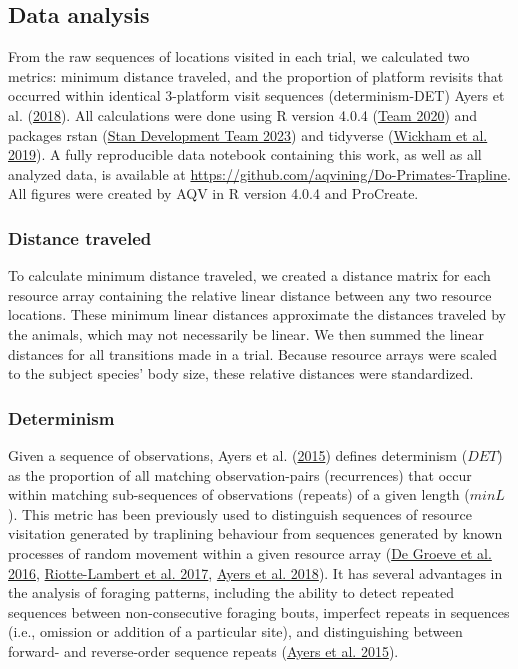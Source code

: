 \documentclass[twoside,12pt,final]{ucthesis-CA2012}
\begin{document}
\begin{ucmainmatter}
\hypertarget{data-analysis}{%
\subsection{Data analysis}\label{data-analysis}}

From the raw sequences of locations visited in each trial, we calculated two metrics: minimum distance traveled, and the proportion of platform revisits that occurred within identical 3-platform visit sequences (determinism-DET) Ayers et al. (\protect\hyperlink{ref-ayers2018}{2018}). All calculations were done using R version 4.0.4 (\protect\hyperlink{ref-team2020}{Team 2020}) and packages rstan (\protect\hyperlink{ref-standevelopmentteam2023}{Stan Development Team 2023}) and tidyverse (\protect\hyperlink{ref-wickham2019}{Wickham et al. 2019}). A fully reproducible data notebook containing this work, as well as all analyzed data, is available at \url{https://github.com/aqvining/Do-Primates-Trapline}. All figures were created by AQV in R version 4.0.4 and ProCreate.

\hypertarget{distance-traveled}{%
\subsubsection{Distance traveled}\label{distance-traveled}}

To calculate minimum distance traveled, we created a distance matrix for each resource array containing the relative linear distance between any two resource locations. These minimum linear distances approximate the distances traveled by the animals, which may not necessarily be linear. We then summed the linear distances for all transitions made in a trial. Because resource arrays were scaled to the subject species' body size, these relative distances were standardized.

\hypertarget{determinism}{%
\subsubsection{Determinism}\label{determinism}}

Given a sequence of observations, Ayers et al. (\protect\hyperlink{ref-ayers2015}{2015}) defines determinism (\(DET\)) as the proportion of all matching observation-pairs (recurrences) that occur within matching sub-sequences of observations (repeats) of a given length (\(minL\)). This metric has been previously used to distinguish sequences of resource visitation generated by traplining behaviour from sequences generated by known processes of random movement within a given resource array (\protect\hyperlink{ref-degroeve2016}{De Groeve et al. 2016}, \protect\hyperlink{ref-riotte-lambert2017}{Riotte-Lambert et al. 2017}, \protect\hyperlink{ref-ayers2018}{Ayers et al. 2018}). It has several advantages in the analysis of foraging patterns, including the ability to detect repeated sequences between non-consecutive foraging bouts, imperfect repeats in sequences (i.e., omission or addition of a particular site), and distinguishing between forward- and reverse-order sequence repeats (\protect\hyperlink{ref-ayers2015}{Ayers et al. 2015}).


\end{ucmainmatter}
\end{document}
